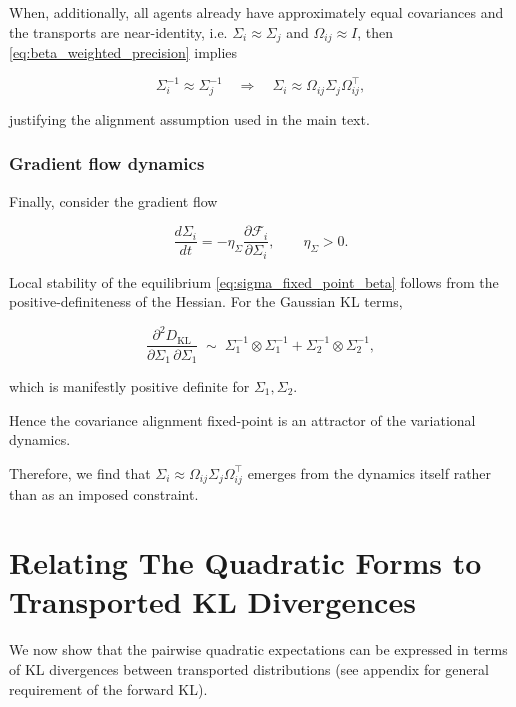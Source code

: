 \documentclass[11pt]{article}
\begin{document}
When, additionally, all agents already have approximately equal covariances and the transports are near-identity, i.e. $\Sigma_i \approx \Sigma_j$ and $\Omega_{ij} \approx I$, then \eqref{eq:beta_weighted_precision} implies

\begin{equation}
\Sigma_i^{-1} \approx \Sigma_j^{-1}
\quad\Longrightarrow\quad
\Sigma_i \approx \Omega_{ij}\Sigma_j\Omega_{ij}^\top,
\end{equation}

justifying the alignment assumption used in the main text.

\subsubsection{Gradient flow dynamics}

Finally, consider the gradient flow

\begin{equation}
\frac{d\Sigma_i}{dt}
=-\eta_\Sigma
\frac{\partial \mathcal{F}_i}{\partial \Sigma_i},
\qquad\eta_\Sigma > 0.
\end{equation}

Local stability of the equilibrium \eqref{eq:sigma_fixed_point_beta} follows from the positive-definiteness of the Hessian. For the Gaussian KL terms,

\begin{equation}
\frac{\partial^2 D_{\mathrm{KL}}}{\partial \Sigma_1 \, \partial \Sigma_1}
\;\sim\;
\Sigma_1^{-1} \otimes \Sigma_1^{-1}
+ \Sigma_2^{-1} \otimes \Sigma_2^{-1},
\end{equation}

which is manifestly positive definite for $\Sigma_1,\Sigma_2$.

Hence the covariance alignment fixed-point is an attractor of the variational dynamics.

Therefore, we find that $\Sigma_i \approx\Omega_{ij}\Sigma_j\Omega_{ij}^\top$ emerges from the dynamics itself rather than as an imposed constraint.


\section{Relating The Quadratic Forms to Transported KL Divergences}
We now show that the pairwise quadratic expectations can be expressed in terms of KL divergences between transported distributions (see appendix for general requirement of the forward KL).
\end{document}
